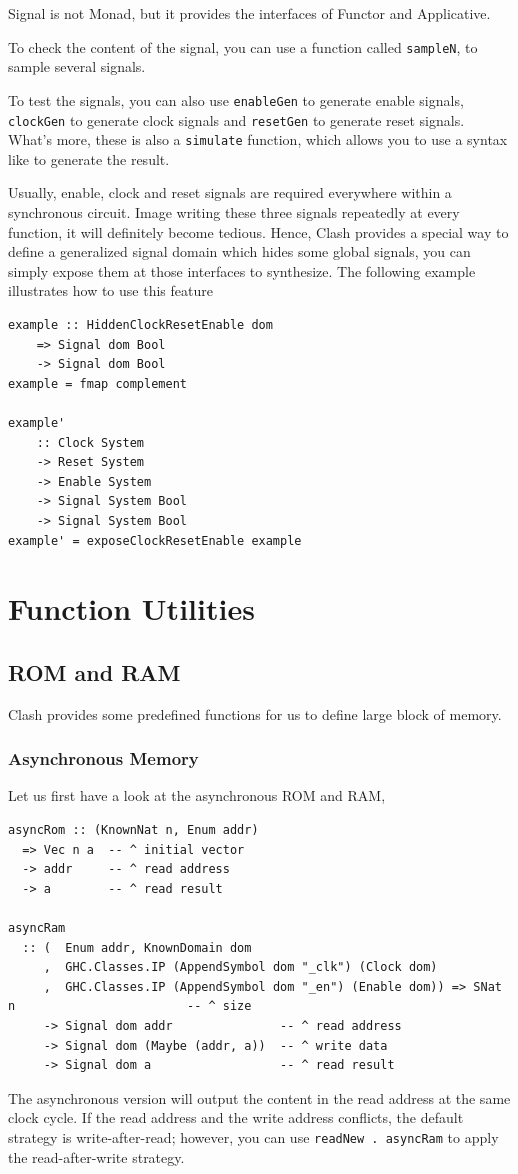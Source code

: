 \documentclass[a4paper,12pt, oneside]{book}
\begin{document}
Signal is not Monad, but it provides the interfaces of Functor and Applicative.

To check the content of the signal, you can use a function called \texttt{sampleN}, to sample several signals.

To test the signals, you can also use \texttt{enableGen} to generate enable signals, 
\texttt{clockGen} to generate clock signals and \texttt{resetGen} to generate reset signals. What's more, these is also a \texttt{simulate} function, which allows you to use a syntax like  to generate the result.

Usually, enable, clock and reset signals are required everywhere within a synchronous circuit. Image writing these three signals repeatedly at every function, it will definitely become tedious. Hence, Clash provides a special way to define a generalized signal domain which hides some global signals, you can simply expose them at those interfaces to synthesize.
The following example illustrates how to use this feature
\begin{verbatim}
example :: HiddenClockResetEnable dom
    => Signal dom Bool
    -> Signal dom Bool
example = fmap complement

example' 
    :: Clock System
    -> Reset System
    -> Enable System
    -> Signal System Bool
    -> Signal System Bool
example' = exposeClockResetEnable example 
\end{verbatim} 

\section{Function Utilities}
\subsection{ROM and RAM}
Clash provides some predefined functions for us to define large block of memory. 
\subsubsection{Asynchronous Memory}
Let us first have a look at the asynchronous ROM and RAM,
\begin{verbatim}
asyncRom :: (KnownNat n, Enum addr) 
  => Vec n a  -- ^ initial vector 
  -> addr     -- ^ read address
  -> a        -- ^ read result         

asyncRam
  :: (  Enum addr, KnownDomain dom
     ,  GHC.Classes.IP (AppendSymbol dom "_clk") (Clock dom)
     ,  GHC.Classes.IP (AppendSymbol dom "_en") (Enable dom)) => SNat n                        -- ^ size
     -> Signal dom addr               -- ^ read address
     -> Signal dom (Maybe (addr, a))  -- ^ write data
     -> Signal dom a                  -- ^ read result
\end{verbatim}
The asynchronous version will output the content in the read address at the same clock cycle. If the read address and the write address conflicts, the default strategy is write-after-read; however, you can use \texttt{readNew . asyncRam} to apply the read-after-write strategy.
\end{document}
